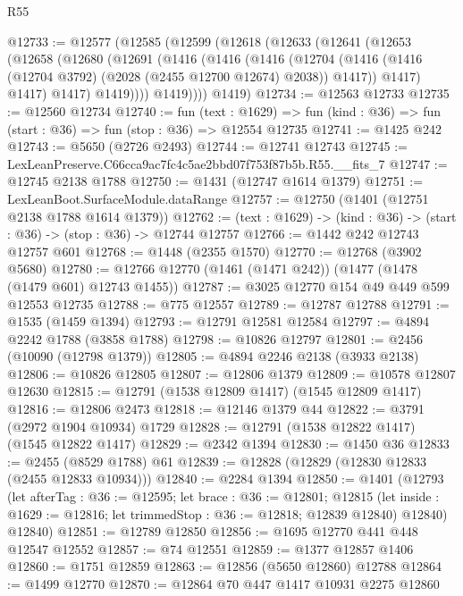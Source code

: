\begin{lexlean}{R55}
\begin{coremodule}
{{@12733 := @12577
    (@12585
      (@12599
        (@12618
          (@12633
            (@12641
              (@12653
                (@12658
                  (@12680
                    (@12691
                      (@1416
                        (@1416
                          (@1416
                            (@12704
                              (@1416
                                (@1416 (@12704 @3792) (@2028 (@2455 @12700 @12674) @2038))
                                @1417))
                            @1417)
                          @1417)
                        @1417)
                      @1419))))
              @1419))))
      @1419)
@12734 := @12563 @12733
@12735 := @12560 @12734
@12740 := fun (text : @1629) =>
  fun (kind : @36) => fun (start : @36) => fun (stop : @36) => @12554 @12735
@12741 := @1425 @242
@12743 := @5650 (@2726 @2493)
@12744 := @12741 @12743
@12745 := LexLeanPreserve.C66cca9ac7fc4c5ae2bbd07f753f87b5b.R55.__fits_7
@12747 := @12745 @2138 @1788
@12750 := @1431 (@12747 @1614 @1379)
@12751 := LexLeanBoot.SurfaceModule.dataRange
@12757 := @12750 (@1401 (@12751 @2138 @1788 @1614 @1379))
@12762 := (text : @1629) -> (kind : @36) -> (start : @36) -> (stop : @36) -> @12744 @12757
@12766 := @1442 @242 @12743 @12757 @601
@12768 := @1448 (@2355 @1570)
@12770 := @12768 (@3902 @5680)
@12780 := @12766 @12770 (@1461 (@1471 @242)) (@1477 (@1478 (@1479 @601) @12743 @1455))
@12787 := @3025 @12770 @154 @49 @449 @599 @12553 @12735
@12788 := @775 @12557
@12789 := @12787 @12788
@12791 := @1535 (@1459 @1394)
@12793 := @12791 @12581 @12584
@12797 := @4894 @2242 @1788 (@3858 @1788)
@12798 := @10826 @12797
@12801 := @2456 (@10090 (@12798 @1379))
@12805 := @4894 @2246 @2138 (@3933 @2138)
@12806 := @10826 @12805
@12807 := @12806 @1379
@12809 := @10578 @12807 @12630
@12815 := @12791 (@1538 @12809 @1417) (@1545 @12809 @1417)
@12816 := @12806 @2473
@12818 := @12146 @1379 @44
@12822 := @3791 (@2972 @1904 @10934) @1729
@12828 := @12791 (@1538 @12822 @1417) (@1545 @12822 @1417)
@12829 := @2342 @1394
@12830 := @1450 @36
@12833 := @2455 (@8529 @1788) @61
@12839 := @12828 (@12829 (@12830 @12833 (@2455 @12833 @10934)))
@12840 := @2284 @1394
@12850 := @1401
    (@12793
      (let afterTag : @36 := @12595;
      let brace : @36 := @12801;
      @12815 (let inside : @1629 := @12816; let trimmedStop : @36 := @12818; @12839 @12840) @12840)
      @12840)
@12851 := @12789 @12850
@12856 := @1695 @12770 @441 @448 @12547 @12552
@12857 := @74 @12551
@12859 := @1377 @12857 @1406
@12860 := @1751 @12859
@12863 := @12856 (@5650 @12860) @12788
@12864 := @1499 @12770
@12870 := @12864 @70 @447 @1417 @10931 @2275 @12860
}}
\end{coremodule}
\end{lexlean}
